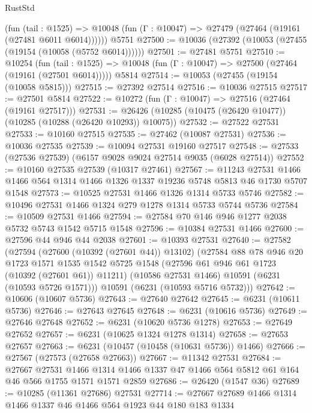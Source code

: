 \begin{lexlean}{RustStd}
\begin{coremodule}
{{      (fun (tail : @1525) =>
      @10048 (fun (Γ : @10047) => @27479 (@27464 (@19161 (@27481 @6011 @6014))))))
    @5751
@27500 := @10036 (@27392 (@10053 (@27455 (@19154 (@10058 (@5752 @6014))))))
@27501 := @27481 @5751
@27510 := @10254
    (fun (tail : @1525) => @10048 (fun (Γ : @10047) => @27500 (@27464 (@19161 (@27501 @6014)))))
    @5814
@27514 := @10053 (@27455 (@19154 (@10058 @5815)))
@27515 := @27392 @27514
@27516 := @10036 @27515
@27517 := @27501 @5814
@27522 := @10272 (fun (Γ : @10047) => @27516 (@27464 (@19161 @27517)))
@27531 := @26426 (@10285 (@10475 (@26420 @10477)) (@10285 (@10288 (@26420 @10293)) @10075))
@27532 := @27522 @27531
@27533 := @10160 @27515
@27535 := @27462 (@10087 @27531)
@27536 := @10036 @27535
@27539 := @10094 @27531 @19160 @27517
@27548 := @27533 (@27536 @27539) (@6157 @9028 @9024 @27514 @9035 (@6028 @27514))
@27552 := @10160 @27535 @27539 (@10317 @27461)
@27567 := @11243
    @27531
    @1466
    @1466
    @564
    @1314
    @1466
    @1326
    @1337
    @19236
    @5748
    @5813
    @46
    @1730
    @5707
    @1548
@27573 := @10525 @27531 @1466 @1326 @1314 @5733 @5746
@27582 := @10496 @27531 @1466 @1324 @279 @1278 @1314 @5733 @5744 @5736
@27584 := @10509 @27531 @1466
@27594 := @27584 @70 @146 @946 @1277 @2038 @5732 @5743 @1542 @5715 @1548
@27596 := @10384 @27531 @1466
@27600 := @27596 @44 @946 @44 @2038
@27601 := @10393 @27531
@27640 := @27582
    (@27594
      (@27600 (@10392 (@27601 @44)) @13102)
      (@27584
        @88
        @78
        @946
        @20
        @1723
        @1571
        @1535
        @1542
        @5725
        @1548
        (@27596 @61 @946 @61 @1723 (@10392 (@27601 @61)) @11211)
        (@10586 @27531 @1466)
        @10591
        (@6231 (@10593 @5726 @1571)))
      @10591
      (@6231 (@10593 @5716 @5732)))
@27642 := @10606 (@10607 @5736)
@27643 := @27640 @27642
@27645 := @6231 (@10611 @5736)
@27646 := @27643 @27645
@27648 := @6231 (@10616 @5736)
@27649 := @27646 @27648
@27652 := @6231 (@10620 @5736 @1278)
@27653 := @27649 @27652
@27657 := @6231 (@10625 @1324 @1278 @1314)
@27658 := @27653 @27657
@27663 := @6231 (@10457 (@10458 (@10631 @5736)) @1466)
@27666 := @27567 (@27573 (@27658 @27663))
@27667 := @11342 @27531
@27684 := @27667
    @27531
    @1466
    @1314
    @1466
    @1337
    @47
    @1466
    @564
    @5812
    @61
    @164
    @46
    @566
    @1755
    @1571
    @1571
    @2859
@27686 := @26420 (@1547 @36)
@27689 := @10285 (@11361 @27686) @27531
@27714 := @27667
    @27689
    @1466
    @1314
    @1466
    @1337
    @46
    @1466
    @564
    @1923
    @44
    @180
    @183
    @1334
}}
\end{coremodule}
\end{lexlean}
